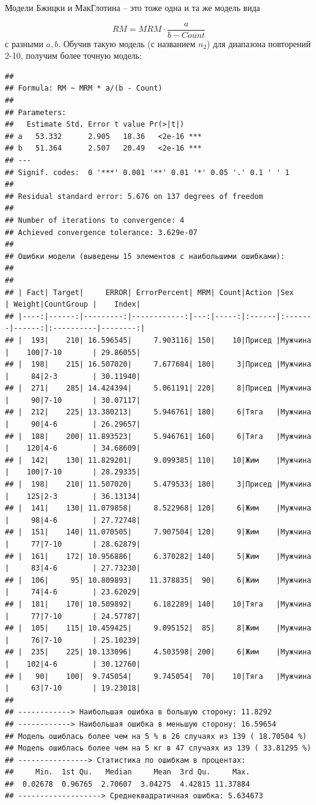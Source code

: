 \documentclass[
]{article}
\begin{document}
Модели Бжицки и МакГлотина -- это тоже одна и та же модель вида

\[RM=MRM \cdot \frac{a}{b-Count}\] с разными \(a, b\). Обучив такую
модель (с названием \(n_2\)) для диапазона повторений 2-10, получим
более точную модель:

\begin{verbatim}
## 
## Formula: RM ~ MRM * a/(b - Count)
## 
## Parameters:
##   Estimate Std. Error t value Pr(>|t|)    
## a   53.332      2.905   18.36   <2e-16 ***
## b   51.364      2.507   20.49   <2e-16 ***
## ---
## Signif. codes:  0 '***' 0.001 '**' 0.01 '*' 0.05 '.' 0.1 ' ' 1
## 
## Residual standard error: 5.676 on 137 degrees of freedom
## 
## Number of iterations to convergence: 4 
## Achieved convergence tolerance: 3.629e-07
## 
## Ошибки модели (выведены 15 элементов с наибольшими ошибками): 
## 
## 
## | Fact| Target|     ERROR| ErrorPercent| MRM| Count|Action |Sex     | Weight|CountGroup |    Index|
## |----:|------:|---------:|------------:|---:|-----:|:------|:-------|------:|:----------|--------:|
## |  193|    210| 16.596545|     7.903116| 150|    10|Присед |Мужчина |    100|7-10       | 29.86055|
## |  198|    215| 16.507020|     7.677684| 180|     3|Присед |Мужчина |     84|2-3        | 30.11940|
## |  271|    285| 14.424394|     5.061191| 220|     8|Присед |Мужчина |     90|7-10       | 30.07117|
## |  212|    225| 13.380213|     5.946761| 180|     6|Тяга   |Мужчина |     90|4-6        | 26.29657|
## |  188|    200| 11.893523|     5.946761| 160|     6|Тяга   |Мужчина |    120|4-6        | 34.68609|
## |  142|    130| 11.829201|     9.099385| 110|    10|Жим    |Мужчина |    100|7-10       | 28.29335|
## |  198|    210| 11.507020|     5.479533| 180|     3|Присед |Мужчина |    125|2-3        | 36.13134|
## |  141|    130| 11.079858|     8.522968| 120|     6|Жим    |Мужчина |     98|4-6        | 27.72748|
## |  151|    140| 11.070505|     7.907504| 120|     9|Жим    |Мужчина |     77|7-10       | 28.62879|
## |  161|    172| 10.956886|     6.370282| 140|     5|Жим    |Мужчина |     83|4-6        | 27.73230|
## |  106|     95| 10.809893|    11.378835|  90|     6|Жим    |Мужчина |     74|4-6        | 23.62029|
## |  181|    170| 10.509892|     6.182289| 140|    10|Тяга   |Мужчина |     77|7-10       | 24.57787|
## |  105|    115| 10.459425|     9.095152|  85|     8|Жим    |Мужчина |     76|7-10       | 25.10239|
## |  235|    225| 10.133096|     4.503598| 200|     6|Жим    |Мужчина |    102|4-6        | 30.12760|
## |   90|    100|  9.745054|     9.745054|  70|    10|Тяга   |Мужчина |     63|7-10       | 19.23018|
## 
## ------------> Наибольшая ошибка в большую сторону: 11.8292 
## ------------> Наибольшая ошибка в меньшую сторону: 16.59654 
## Модель ошиблась более чем на 5 % в 26 случаях из 139 ( 18.70504 %)
## Модель ошиблась более чем на 5 кг в 47 случаях из 139 ( 33.81295 %)
## ----------------> Статистика по ошибкам в процентах:
##     Min.  1st Qu.   Median     Mean  3rd Qu.     Max. 
##  0.02678  0.96765  2.70607  3.04275  4.42815 11.37884 
## -------------------> Среднеквадратичная ошибка: 5.634673
\end{verbatim}
\end{document}
